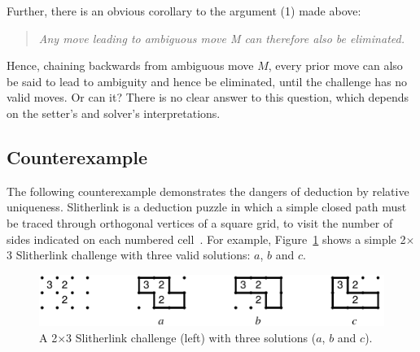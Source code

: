 \documentclass[12pt]{gapd}
\begin{document}
Further, there is an obvious corollary to the argument (1) made above:

\begin{quote}\itshape
  Any move leading to ambiguous move M can therefore also be
  eliminated.
\end{quote}

Hence, chaining backwards from ambiguous move $M$, every prior move
can also be said to lead to ambiguity and hence be eliminated, until
the challenge has no valid moves.  Or can it?  There is no clear
answer to this question, which depends on the setter's and solver's
interpretations.

\subsection{Counterexample}
\label{sec:Counteraxeample}

The following counterexample demonstrates the dangers of deduction by
relative uniqueness.  Slitherlink is a deduction puzzle in which a
simple closed path must be traced through orthogonal vertices of a
square grid, to visit the number of sides indicated on each numbered
cell~\cite{times}.  For example, Figure~\ref{fig:SlitherlinkSolutions}
shows a simple 2$\times$3 Slitherlink challenge with three valid
solutions: $a$, $b$ and $c$.

\begin{figure}[!thb]
  \centering
  \includegraphics[width=\linewidth]{graphics/slitherlink-solns-1.pdf}
  \caption{A 2$\times$3
  Slitherlink challenge (left) with three solutions ($a$, $b$ and
  $c$).}
  \label{fig:SlitherlinkSolutions}
\end{figure}
\end{document}

